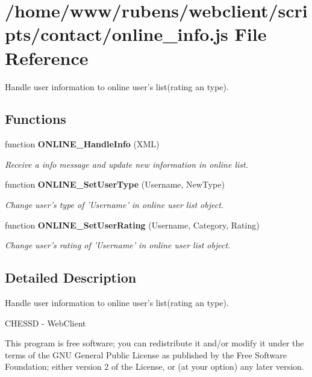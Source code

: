 \section{/home/www/rubens/webclient/scripts/contact/online\_\-info.js File Reference}
\label{online__info_8js}
Handle user information to online user's list(rating an type). 

\subsection*{Functions}
\begin{CompactItemize}
\item 
function {\bf ONLINE\_\-HandleInfo} (XML)
\begin{CompactList}\small\item\em Receive a info message and update new information in online list. \item\end{CompactList}\item 
function {\bf ONLINE\_\-SetUserType} (Username, NewType)
\begin{CompactList}\small\item\em Change user's type of 'Username' in online user list object. \item\end{CompactList}\item 
function {\bf ONLINE\_\-SetUserRating} (Username, Category, Rating)
\begin{CompactList}\small\item\em Change user's rating of 'Username' in online user list object. \item\end{CompactList}\end{CompactItemize}


\subsection{Detailed Description}
Handle user information to online user's list(rating an type). 

CHESSD - WebClient

This program is free software; you can redistribute it and/or modify it under the terms of the GNU General Public License as published by the Free Software Foundation; either version 2 of the License, or (at your option) any later version.

